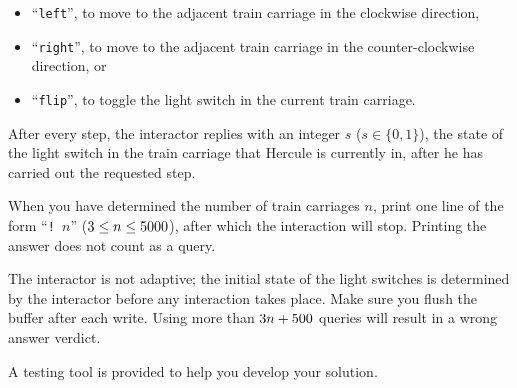 \begin{itemize}
  \item ``\texttt{left}'', to move to the adjacent train carriage in the clockwise direction,
  \item ``\texttt{right}'', to move to the adjacent train carriage in the
        counter-clockwise direction, or
  \item ``\texttt{flip}'', to toggle the light switch in the current train carriage.
\end{itemize}

After every step, the interactor replies with an integer $s$ ($s \in \{0,1\}$),
the state of the light switch in the train carriage that Hercule is currently
in, after he has carried out the requested step.

When you have determined the number of train carriages $n$,
print one line of the form ``\texttt{!~}$n$'' ($3 \leq n \leq 5000$),
after which the interaction will stop.
Printing the answer does not count as a query.

The interactor is not adaptive; the initial state of the light switches is
determined by the interactor before any interaction takes place.
Make sure you flush the buffer after each write.
Using more than $3n+500$ queries will result in a wrong answer verdict.

A testing tool is provided to help you develop your solution.
